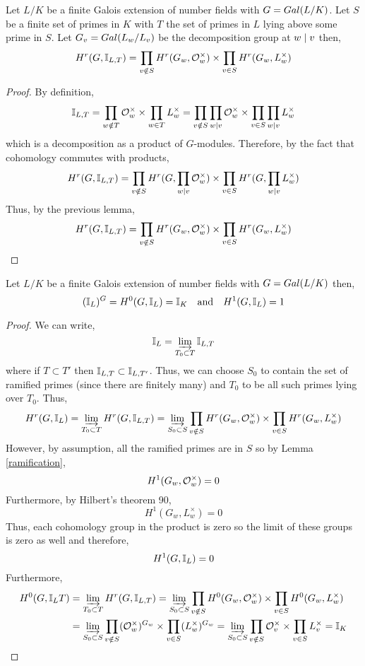 \documentclass[12pt]{extarticle}
\begin{document}
\begin{lemma} \label{ramified_primes_decomp}
Let $L/K$ be a finite Galois extension of number fields with $G = Gal \small(L/K \small)$. Let $S$ be a finite set of primes in $K$ with $T$ the set of primes in $L$ lying above some prime in $S$. Let $G_v = Gal \small(L_w / L_v \small)$ be the decomposition group at $w \mid v$ then,
\[ H^r(G, \mathbb{I}_{L, T}) = \prod_{v \notin S} H^r(G_w, \mathcal{O}_{w}^\times) \times \prod_{v \in S} H^r(G_w, L_{w}^\times) \] 
\end{lemma}

\begin{proof}
By definition,
\[ \mathbb{I}_{L, T} = \prod_{w \notin T} \mathcal{O}_{w}^\times \times \prod_{w \in T} L_w^\times = \prod_{v \notin S} \prod_{w \mid v} \mathcal{O}_{w}^\times \times \prod_{v \in S} \prod_{w \mid v} L_w^\times \]
which is a decomposition as a product of $G$-modules. Therefore, by the fact that cohomology commutes with products,
\[ H^r(G, \mathbb{I}_{L, T}) = \prod_{v \notin S} H^r(G, \prod_{w \mid v} \mathcal{O}_{w}^\times) \times \prod_{v \in S} H^r(G, \prod_{w \mid v} L_w^\times) \]
Thus, by the previous lemma,
\[ H^r(G, \mathbb{I}_{L, T}) = \prod_{v \notin S} H^r(G_w, \mathcal{O}_{w}^\times) \times \prod_{v \in S} H^r(G_w, L_{w}^\times) \]
\end{proof}

\begin{lemma} \label{particulars}
Let $L/K$ be a finite Galois extension of number fields with $G = Gal \small(L/K \small)$ then,
\[(\mathbb{I}_{L})^G = H^0(G, \mathbb{I}_{L}) = \mathbb{I}_{K} \quad \text{and} \quad H^1(G, \mathbb{I}_{L}) = 1\]
\end{lemma}

\begin{proof}
We can write,
\[ \mathbb{I}_{L} = \varinjlim_{T_0 \subset T} \mathbb{I}_{L, T} \]
where if $T \subset T'$ then $\mathbb{I}_{L, T} \subset \mathbb{I}_{L, T'}$. Thus, we can choose $S_0$ to contain the set of ramified primes (since there are finitely many) and $T_0$ to be all such primes lying over $T_0$. Thus,
\[ H^r(G, \mathbb{I}_{L}) =  \varinjlim_{T_0 \subset T} H^r(G, \mathbb{I}_{L, T}) = \varinjlim_{S_0 \subset S} \prod_{v \notin S} H^r(G_w, \mathcal{O}_{w}^\times) \times \prod_{v \in S} H^r(G_w, L_{w}^\times) \]
However, by assumption, all the ramified primes are in $S$ so by Lemma \ref{ramification},
\[ H^1(G_w, \mathcal{O}_{w}^\times) = 0 \]
Furthermore, by Hilbert's theorem 90,
\[ H^1(G_w, L_{w}^\times) = 0 \]
Thus, each cohomology group in the product is zero so the limit of these groups is zero as well and therefore, 
\[ H^1(G, \mathbb{I}_{L}) = 0 \]
Furthermore,
\begin{align*}
H^0(G, \mathbb{I}_{L}{T}) & = \varinjlim_{T_0 \subset T} H^r(G, \mathbb{I}_{L, T}) = \varinjlim_{S_0 \subset S} \prod_{v \notin S} H^0(G_w, \mathcal{O}_{w}^\times) \times \prod_{v \in S} H^0(G_w, L_{w}^\times)
\\
& = \varinjlim_{S_0 \subset S} \prod_{v \notin S} (\mathcal{O}_{w}^\times)^{G_w} \times \prod_{v \in S} (L_{w}^\times)^{G_w}
= \varinjlim_{S_0 \subset S} \prod_{v \notin S} \mathcal{O}_{v}^\times \times \prod_{v \in S} L_v^\times = \mathbb{I}_{K}
\end{align*}
\end{proof}
\end{document}
